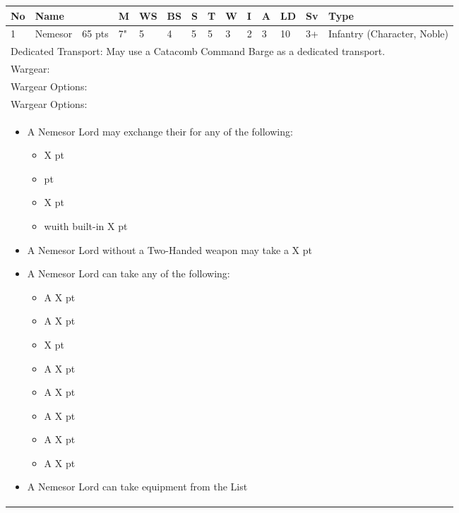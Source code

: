 \noindent
\begin{tabular}{||m{10pt} m{95pt} m{30pt} m{11pt} m{11pt} m{11pt} m{11pt} m{11pt} m{11pt} m{11pt} m{11pt} m{11pt} m{11pt} m{125pt}||}
	\hline
	No & Name & & M & WS & BS & S & T & W & I & A & LD & Sv & Type \\
	\hline
	1 & Nemesor & 65 pts & 7" & 5 & 4 & 5 & 5 & 3 & 2 & 3 & 10 & 3+ & Infantry (Character, Noble)\\
	\hline
	\hline	
	\multicolumn{14}{||Z{532 pt}||}{Dedicated Transport: May use a Catacomb Command Barge as a dedicated transport.}\\	
	\hline
	\hline
	\multicolumn{14}{||Z{532 pt}||}{Wargear: \quickref{Staff of Light}}\\
	\multicolumn{14}{||Z{532 pt}||}{Wargear Options:} \\
	\multicolumn{14}{||Z{532 pt}||}{Wargear Options:} \\	
	\multicolumn{14}{||Z{532 pt}||}{\begin{itemize}
			\item A Nemesor Lord may exchange their \quickref{Staff of Light} for any of the following:
			\begin{itemize}
				\item \quickref{Hyperphase Sword} \hrulefill X pt
				\item \quickref{Voidblade} \hrulefill 0 pt
				\item \quickref{Warscythe} \hrulefill X pt
				\item \quickref{Warscythe} wuith built-in \quickref{Relic Gauss Blaster} \hrulefill X pt
			\end{itemize}
			\item A Nemesor Lord without a Two-Handed weapon may take a \quickref{Dispersion Shield} \hrulefill X pt
			\item A Nemesor Lord can take any of the following:
			\begin{itemize}
				\item A \quickref{Gauntlet of Fire} \hrulefill X pt
				\item A \quickref{Tachyon Arrow} \hrulefill X pt
				\item \quickref{Mindshackle Scarabs} \hrulefill X pt
				\item A \quickref{Phase Shifter} \hrulefill X pt
				\item A \quickref{Phylactery} \hrulefill X pt
				\item A \quickref{Sempiternal Weave} \hrulefill X pt
				\item A \quickref{Resurrection Orb} \hrulefill X pt
				\item A \quickref{Tesseract Labyrinth} \hrulefill X pt
			\end{itemize}
			\item A Nemesor Lord can take equipment from the \quickref{Artefacts of the Aeons} List
	\end{itemize}} \\		
\end{tabular}

